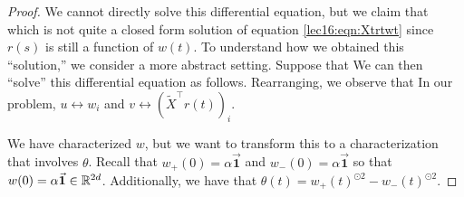 \begin{proof}
We cannot directly solve this differential equation, but we claim that
which is not quite a closed form solution of equation \ref{lec16:eqn:Xtrtwt} since $r(s)$ is still a function of $w(t)$.  To understand how we obtained this ``solution,'' we consider a more abstract setting. Suppose that
We can then ``solve'' this differential equation as follows. Rearranging, we observe that
In our problem, $u \leftrightarrow w_i$ and $v \leftrightarrow (\tilde{X}^\top r(t))_i$.

We have characterized $w$, but we want to transform this to a characterization that involves $\theta$.
Recall that \(w_+(0) = \alpha \vec{\mathbf{1}}\) and \(w_-(0) = \alpha \vec{\mathbf{1}}\) so that \(w(0) = \alpha \vec{\mathbf{1}} \in \mathbb R^{2d}\). Additionally, we have that \(\theta(t) = w_+(t)^{\odot 2} - w_-(t)^{\odot 2} \).


\end{proof}
